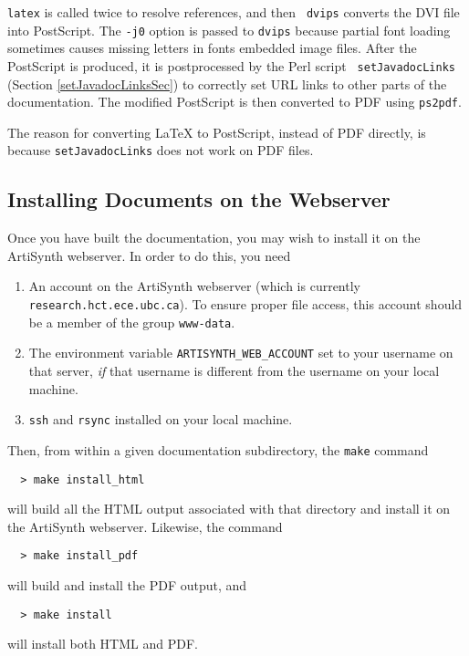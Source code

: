 \documentclass{article}
\begin{document}
{\tt latex} is called twice to resolve references, and then {\tt
dvips} converts the DVI file into PostScript. The {\tt -j0} option is
passed to {\tt dvips} because partial font loading sometimes causes
missing letters in fonts embedded image files.  After the PostScript
is produced, it is postprocessed by the Perl script {\tt
setJavadocLinks} (Section \ref{setJavadocLinksSec}) to correctly set
URL links to other parts of the documentation. The modified PostScript
is then converted to PDF using {\tt ps2pdf}.

\begin{sideblock}
The reason for converting LaTeX to PostScript, instead of PDF directly, is because
{\tt setJavadocLinks} does not work on PDF files.
\end{sideblock}

\subsection{Installing Documents on the Webserver}
\label{InstallingSec}

Once you have built the documentation, you may wish to install it on the
ArtiSynth webserver. In order to do this, you need

\begin{enumerate}
\item An account on the ArtiSynth webserver (which is currently {\tt
research.hct.ece.ubc.ca}). To ensure proper file access, this account
should be a member of the group {\tt www-data}.
\item The environment variable {\tt ARTISYNTH\_WEB\_ACCOUNT} set to
your username on that server, {\it if} that username is different
from the username on your local machine.
\item {\tt ssh} and {\tt rsync} installed on your local machine.
\end{enumerate}

Then, from within a given documentation subdirectory, the {\tt make}
command
%
\begin {verbatim}
  > make install_html
\end{verbatim}
%
will build all the HTML output associated with that directory and install
it on the ArtiSynth webserver. Likewise, the command
%
\begin {verbatim}
  > make install_pdf
\end{verbatim}
%
will build and install the PDF output, and
%
\begin {verbatim}
  > make install
\end{verbatim}
%
will install both HTML and PDF.
\end{document}

